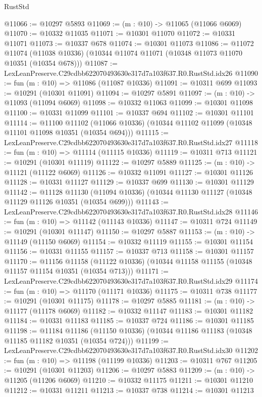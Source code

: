 \begin{lexlean}{RustStd}
\begin{coremodule}
@11066 := @10297 @5893
@11069 := (m : @10) -> @11065 (@11066 @6069)
@11070 := @10332 @11035
@11071 := @10301 @11070
@11072 := @10331 @11071
@11073 := @10337 @678
@11074 := @10301 @11073
@11086 := @11072
    @11074
    (@11038 @10336)
    (@10344 @11074 @11071 (@10348 @11073 @11070 @10351 (@10354 @678)))
@11087 := LexLeanPreserve.C29cdbb622070493630e317d7a103f637.R0.RustStd.idx26
@11090 := fun (m : @10) => @11086 (@11087 @10336)
@11091 := @10311 @699
@11093 := @10291 (@10301 @11091)
@11094 := @10297 @5891
@11097 := (m : @10) -> @11093 (@11094 @6069)
@11098 := @10332 @11063
@11099 := @10301 @11098
@11100 := @10331 @11099
@11101 := @10337 @694
@11102 := @10301 @11101
@11114 := @11100
    @11102
    (@11066 @10336)
    (@10344 @11102 @11099 (@10348 @11101 @11098 @10351 (@10354 @694)))
@11115 := LexLeanPreserve.C29cdbb622070493630e317d7a103f637.R0.RustStd.idx27
@11118 := fun (m : @10) => @11114 (@11115 @10336)
@11119 := @10311 @713
@11121 := @10291 (@10301 @11119)
@11122 := @10297 @5889
@11125 := (m : @10) -> @11121 (@11122 @6069)
@11126 := @10332 @11091
@11127 := @10301 @11126
@11128 := @10331 @11127
@11129 := @10337 @699
@11130 := @10301 @11129
@11142 := @11128
    @11130
    (@11094 @10336)
    (@10344 @11130 @11127 (@10348 @11129 @11126 @10351 (@10354 @699)))
@11143 := LexLeanPreserve.C29cdbb622070493630e317d7a103f637.R0.RustStd.idx28
@11146 := fun (m : @10) => @11142 (@11143 @10336)
@11147 := @10311 @724
@11149 := @10291 (@10301 @11147)
@11150 := @10297 @5887
@11153 := (m : @10) -> @11149 (@11150 @6069)
@11154 := @10332 @11119
@11155 := @10301 @11154
@11156 := @10331 @11155
@11157 := @10337 @713
@11158 := @10301 @11157
@11170 := @11156
    @11158
    (@11122 @10336)
    (@10344 @11158 @11155 (@10348 @11157 @11154 @10351 (@10354 @713)))
@11171 := LexLeanPreserve.C29cdbb622070493630e317d7a103f637.R0.RustStd.idx29
@11174 := fun (m : @10) => @11170 (@11171 @10336)
@11175 := @10311 @738
@11177 := @10291 (@10301 @11175)
@11178 := @10297 @5885
@11181 := (m : @10) -> @11177 (@11178 @6069)
@11182 := @10332 @11147
@11183 := @10301 @11182
@11184 := @10331 @11183
@11185 := @10337 @724
@11186 := @10301 @11185
@11198 := @11184
    @11186
    (@11150 @10336)
    (@10344 @11186 @11183 (@10348 @11185 @11182 @10351 (@10354 @724)))
@11199 := LexLeanPreserve.C29cdbb622070493630e317d7a103f637.R0.RustStd.idx30
@11202 := fun (m : @10) => @11198 (@11199 @10336)
@11203 := @10311 @767
@11205 := @10291 (@10301 @11203)
@11206 := @10297 @5883
@11209 := (m : @10) -> @11205 (@11206 @6069)
@11210 := @10332 @11175
@11211 := @10301 @11210
@11212 := @10331 @11211
@11213 := @10337 @738
@11214 := @10301 @11213

\end{coremodule}
\end{lexlean}
